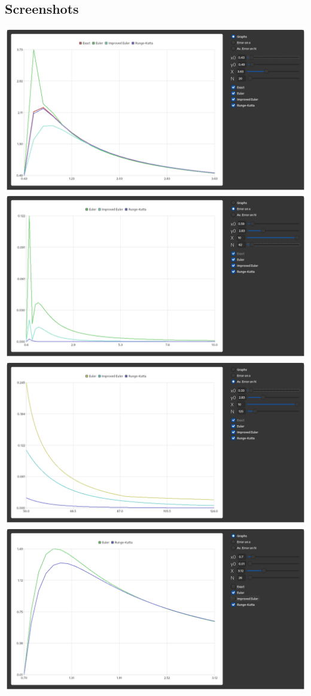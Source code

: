 \documentclass[12pt]{article}
\begin{document}
\subsection*{Screenshots}
\includegraphics[scale=0.4]{resources/Screenshot1.png}
\includegraphics[scale=0.4]{resources/Screenshot2.png}
\includegraphics[scale=0.4]{resources/Screenshot3.png}
\includegraphics[scale=0.4]{resources/Screenshot4.png}
\end{document}
